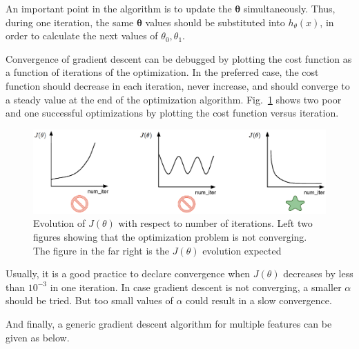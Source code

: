 An important point in the algorithm is to update the $\bm{\theta}$ simultaneously. 
Thus, during one iteration, the same $\bm{\theta}$ values should be substituted into $h_\theta(x)$, in order to calculate the next values of $\theta_0, \theta_1$.
 
\iffalse
Convergence of gradient descent can be debugged by plotting the cost function as a function of iterations of the optimization.
In the preferred case, the cost function should decrease in each iteration, never increase, and should converge to a steady value at the end of the optimization algorithm. 
Fig.~\ref{fig:visualizeCostFunc} shows two poor and one successful optimizations by plotting the cost function versus iteration. 

\begin{figure}[hbt]
\begin{center}
\includegraphics[width=15cm]{figures/visualizeCostFunc}    %
\caption{Evolution of $J(\theta)$ with respect to number of iterations. Left two figures showing that the optimization problem is not converging. The figure in the far right is the $J(\theta)$ evolution expected} 
\label{fig:visualizeCostFunc}
\end{center}
\end{figure}

Usually, it is a good practice to declare convergence when $J(\theta)$ decreases by less than $10^{-3}$ in one iteration. 
In case gradient descent is not converging, a smaller $\alpha$ should be tried. 
But too small values of $\alpha$ could result in a slow convergence. 

And finally, a generic gradient descent algorithm for multiple features can be given as below.

